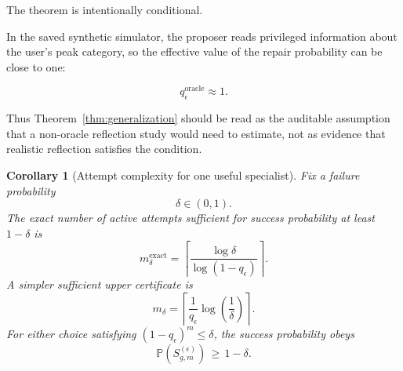 \documentclass{article} %
\newtheorem{corollary}[theorem]{Corollary}
\begin{document}
The theorem is intentionally conditional.

In the saved synthetic simulator, the proposer reads privileged information about the user's peak category, so the effective value of the repair probability can be close to one:

\begin{equation}
\label{eq:app-third-oracle-q}
q_{\epsilon}^{\mathrm{oracle}}
\approx
1.
\end{equation}

Thus Theorem~\ref{thm:generalization} should be read as the auditable assumption that a non-oracle reflection study would need to estimate, not as evidence that realistic reflection satisfies the condition.

\begin{corollary}[Attempt complexity for one useful specialist]
\label{cor:app-specialist-sample}
Fix a failure probability
\begin{equation}
\label{eq:app-third-delta}
\delta
\in
(0,1).
\end{equation}
The exact number of active attempts sufficient for success probability at least \(1-\delta\) is
\begin{equation}
\label{eq:app-third-exact-m}
m_{\delta}^{\mathrm{exact}}
=
\left\lceil
\frac{\log \delta}{\log(1-q_{\epsilon})}
\right\rceil .
\end{equation}
A simpler sufficient upper certificate is
\begin{equation}
\label{eq:app-third-simple-m}
m_{\delta}
=
\left\lceil
\frac{1}{q_{\epsilon}}
\log\!\left(\frac{1}{\delta}\right)
\right\rceil .
\end{equation}
For either choice satisfying \((1-q_{\epsilon})^{m}\le\delta\), the success probability obeys
\begin{equation}
\label{eq:app-third-sample-result}
\mathbb{P}\!\left(
S_{g,m}^{(\epsilon)}
\right)
\,\ge\,
1-\delta.
\end{equation}
\end{corollary}
\end{document}
